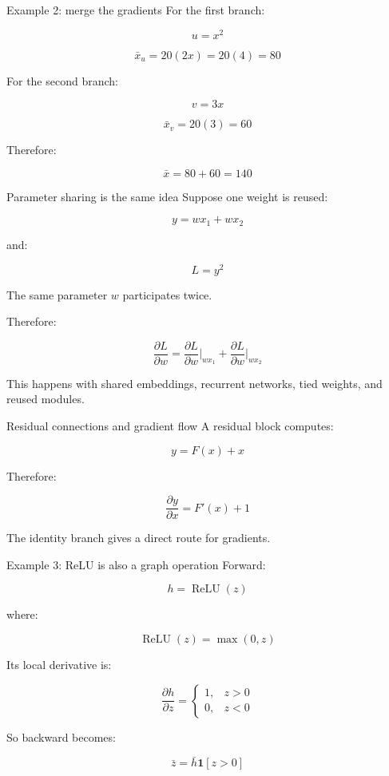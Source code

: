 \documentclass[10pt,aspectratio=169]{beamer}
\newcommand{\grad}[2]{\frac{\partial #1}{\partial #2}}
\newcommand{\adj}[1]{\bar{#1}}
\begin{document}
\begin{frame}[t]{Example 2: merge the gradients}
For the first branch:

\[
u=x^2
\]

\[
\adj{x}_u
=
20(2x)
=
20(4)
=
80
\]

For the second branch:

\[
v=3x
\]

\[
\adj{x}_v
=
20(3)
=
60
\]

Therefore:

\[
\boxed{
\adj{x}=80+60=140
}
\]
\end{frame}

\begin{frame}[t]{Parameter sharing is the same idea}
Suppose one weight is reused:

\[
y=wx_1+wx_2
\]

and:

\[
L=y^2
\]

The same parameter \(w\) participates twice.

Therefore:

\[
\grad{L}{w}
=
\grad{L}{w}\bigg|_{wx_1}
+
\grad{L}{w}\bigg|_{wx_2}
\]

This happens with shared embeddings, recurrent networks, tied weights, and reused modules.
\end{frame}

\begin{frame}[t]{Residual connections and gradient flow}
A residual block computes:

\[
y=F(x)+x
\]

Therefore:

\[
\grad{y}{x}=F'(x)+1
\]

\centering


\vspace{0.25cm}

The identity branch gives a direct route for gradients.
\end{frame}

\begin{frame}[t]{Example 3: ReLU is also a graph operation}
Forward:

\[
h=\operatorname{ReLU}(z)
\]

where:

\[
\operatorname{ReLU}(z)=\max(0,z)
\]

Its local derivative is:

\[
\grad{h}{z}
=
\begin{cases}
1, & z>0 \\
0, & z<0
\end{cases}
\]

So backward becomes:

\[
\boxed{
\adj{z}
=
\adj{h}\mathbf{1}[z>0]
}
\]
\end{frame}
\end{document}
